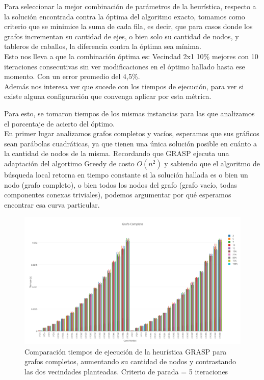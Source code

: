\newpage

Para seleccionar la mejor combinaci\'on de par\'ametros de la heur\'istica, respecto a la soluci\'on encontrada contra la \'optima del algoritmo exacto, tomamos como criterio que se minimice la suma de cada fila, es decir, que para casos donde los grafos incrementan su cantidad de ejes, o bien solo su cantidad de nodos, y tableros de caballos, la diferencia contra la \'optima sea m\'inima.\\

Esto nos lleva a que la combinaci\'on \'optima es: Vecindad 2x1 10\% mejores con 10 iteraciones consecutivas sin ver modificaciones en el \'optimo hallado hasta ese momento. Con un error promedio del 4,5\%.\\

Adem\'as nos interesa ver que sucede con los tiempos de ejecuci\'on, para ver si existe alguna configuraci\'on que convenga aplicar por esta m\'etrica.

Para esto, se tomaron tiempos de los mismas instancias para las que analizamos el porcentaje de acierto del \'optimo.\\

En primer lugar analizamos grafos completos y vac\'ios, esperamos que sus gr\'aficos sean par\'abolas cuadr\'aticas, ya que tienen una \'unica soluci\'on posible en cu\'anto a la cantidad de nodos de la misma. Recordando que GRASP ejecuta una adaptaci\'on del algortimo Greedy de costo $O(n^2)$ y sabiendo que el algoritmo de b\'usqueda local retorna en tiempo constante si la soluci\'on hallada es o bien un nodo (grafo completo), o bien todos los nodos del grafo (grafo vac\'io, todas componentes conexas triviales), podemos argumentar por qu\'e esperamos encontrar esa curva particular.\\

  \begin{figure}[h!]
   \begin{center}
 	\includegraphics[scale=0.35]{imagenes/grasp/completo-5repes.png}
 	\caption{Comparaci\'on tiempos de ejecuci\'on de la heur\'istica GRASP para grafos completos, aumentando su cantidad de nodos y contrastando las dos vecindades planteadas. Criterio de parada = 5 iteraciones}
   \end{center}
 \end{figure}


